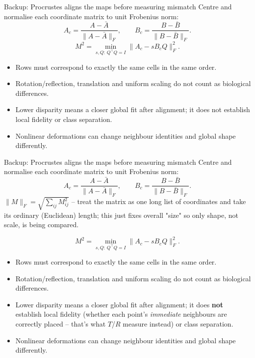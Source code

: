 \documentclass[aspectratio=169,10pt]{beamer}
\newcommand{\compactmath}{%
  \setlength{\abovedisplayskip}{4pt}\setlength{\belowdisplayskip}{4pt}%
  \setlength{\abovedisplayshortskip}{2pt}\setlength{\belowdisplayshortskip}{4pt}}
\begin{document}
\begin{frame}{Backup: Procrustes aligns the maps before measuring mismatch}
  Centre and normalise each coordinate matrix to unit Frobenius norm:
  \[ A_c=\frac{A-\bar A}{\lVert A-\bar A\rVert_F},\qquad B_c=\frac{B-\bar B}{\lVert B-\bar B\rVert_F}.\]
  \[M^2=\min_{s,Q:\,Q^\top Q=I}\lVert A_c-sB_cQ\rVert_F^2.\]
  \smallskip
  \begin{itemize}
    \item Rows must correspond to exactly the same cells in the same order.
    \item Rotation/reflection, translation and uniform scaling do not count as biological differences.
    \item Lower disparity means a closer global fit after alignment; it does not establish local fidelity or class separation.
    \item Nonlinear deformations can change neighbour identities and global shape differently.
  \end{itemize}
\end{frame}

\begin{frame}[shrink=10]{Backup: Procrustes aligns the maps before measuring mismatch}
  \footnotesize\compactmath
  Centre and normalise each coordinate matrix to unit Frobenius norm:
  \[ A_c=\frac{A-\bar A}{\lVert A-\bar A\rVert_F},\qquad B_c=\frac{B-\bar B}{\lVert B-\bar B\rVert_F}.\]
  {\scriptsize $\lVert M\rVert_F=\sqrt{\sum_{ij}M_{ij}^2}$ -- treat the matrix as one long list of coordinates and take its ordinary (Euclidean) length; this just fixes overall "size" so only shape, not scale, is being compared.}\par\smallskip
  \[M^2=\min_{s,Q:\,Q^\top Q=I}\lVert A_c-sB_cQ\rVert_F^2.\]
  \smallskip
  \begin{itemize}
    \footnotesize\setlength{\itemsep}{2pt}
    \item Rows must correspond to exactly the same cells in the same order.
    \item Rotation/reflection, translation and uniform scaling do not count as biological differences.
    \item Lower disparity means a closer global fit after alignment; it does \textbf{not} establish local fidelity (whether each point's \emph{immediate} neighbours are correctly placed -- that's what $T$/$R$ measure instead) or class separation.
    \item Nonlinear deformations can change neighbour identities and global shape differently.
  \end{itemize}
\end{frame}
\end{document}
